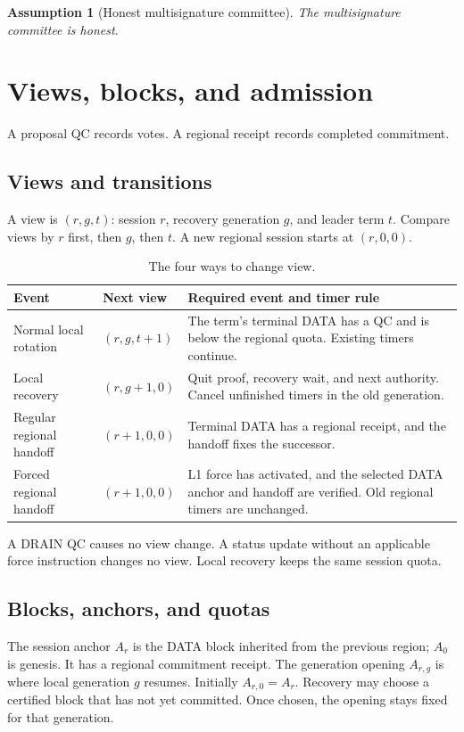 \documentclass[11pt,a4paper]{article}
\newtheorem{assumption}[assumption]{Assumption}
\begin{document}
\begin{assumption}[Honest multisignature committee]
\label{ass:cut}
The multisignature committee is honest.
\end{assumption}

\section{Views, blocks, and admission}
\label{sec:definitions}
A proposal QC records votes. A regional receipt records completed
commitment.

\subsection{Views and transitions}
A view is $(r,g,t)$: session $r$, recovery generation $g$, and leader
term $t$. Compare views by $r$ first, then $g$, then $t$.
A new regional session starts at $(r,0,0)$.

\begin{table}[htbp]\centering\small
\caption{The four ways to change view.}
\label{tab:views}
\begin{tabularx}{\linewidth}{@{}>{\raggedright\arraybackslash}p{.24\linewidth}>{\raggedright\arraybackslash}p{.23\linewidth}Y@{}}
\toprule
Event & Next view & Required event and timer rule\\
\midrule
Normal local rotation & $(r,g,t+1)$ & The term's terminal DATA has a
QC and is below the regional quota. Existing timers continue.\\
Local recovery & $(r,g+1,0)$ & Quit proof, recovery wait, and next
authority. Cancel unfinished timers in the old generation.\\
Regular regional handoff & $(r+1,0,0)$ & Terminal DATA has a regional
receipt, and the handoff fixes the successor.\\
Forced regional handoff & $(r+1,0,0)$ & L1 force has activated, and the
selected DATA anchor and handoff are verified. Old regional timers
are unchanged.\\
\bottomrule
\end{tabularx}
\end{table}
\FloatBarrier
A DRAIN QC causes no view change. A status update without an applicable
force instruction changes no view. Local recovery keeps the same
session quota.

\subsection{Blocks, anchors, and quotas}
\label{sec:positions}
The session anchor $A_r$ is the DATA block inherited from the previous
region; $A_0$ is genesis. It has a regional commitment receipt.
The generation opening $A_{r,g}$ is where local generation $g$ resumes.
Initially $A_{r,0}=A_r$. Recovery may choose a certified block that has
not yet committed. Once chosen, the opening stays fixed for that generation.
\end{document}
